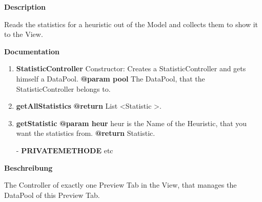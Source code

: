 
\textbf{Description}

Reads the statistics for a heuristic out of the Model and collects them to show it to the View.

\textbf{Documentation}
\begin{enumerate}[+]
	\item{
	\textbf{StatisticController} \newline
	Constructor: Creates a StatisticController and gets himself a DataPool.
	\textbf{@param pool} The DataPool, that the StatisticController belongs to. \newline
}
	\item{
	\textbf{getAllStatistics} \newline
	\textbf{@return} List <Statistic >. \newline
}
	\item{
	\textbf{getStatistic} \newline
	\textbf{@param heur} heur is the Name of the Heuristic, that you want the statistics from. \newline
	\textbf{@return} Statistic. \newline
}
	\item[-]{
		\textbf{PRIVATEMETHODE} etc
	}
\end{enumerate}


\textbf{Beschreibung}

The Controller of exactly one Preview Tab in the View, that manages the DataPool of this Preview Tab.

